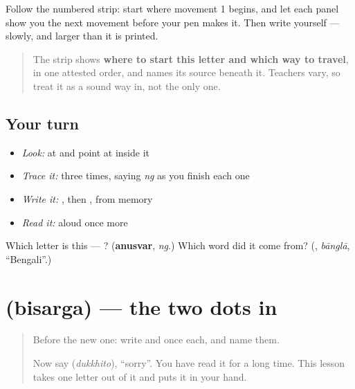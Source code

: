 Follow the numbered strip: start where movement 1 begins, and let each panel show you the next movement before your pen makes it. Then write  yourself — slowly, and larger than it is printed.

\begin{quote}
The strip shows \textbf{where to start this letter and which way to travel}, in one attested order, and names its source beneath it. Teachers vary, so treat it as a sound way in, not the only one.
\end{quote}

\subsection*{Your turn}
\begin{itemize}
\raggedright
  \item \emph{Look:} at \textbf{} and point at  inside it
  \item \emph{Trace it:}  three times, saying \emph{ng} as you finish each one
  \item \emph{Write it:} , then , from memory
  \item \emph{Read it:} \textbf{} aloud once more
\end{itemize}

\begin{tcolorbox}[breakable,colback=teal!4,colframe=teal!35!black,title={Before you move on}]
Which letter is this — ? (\textbf{anusvar}, \emph{ng}.) Which word did it come from? (\textbf{}, \emph{bānglā}, \textquotedblleft{}Bengali\textquotedblright{}.)
\end{tcolorbox}
\section[\texorpdfstring{\bn{ঃ} (bisarga)}{ঃ (bisarga)}]{ (bisarga) — the two dots in }

\label{lesson:BN-W41-bisarga}



\begin{quote}
Before the new one: write  and  once each, and name them.

Now say \textbf{} (\emph{dukkhito}), \textquotedblleft{}sorry\textquotedblright{}. You have read it for a long time. This lesson takes one letter out of it and puts it in your hand.
\end{quote}


